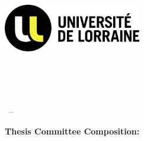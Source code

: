 \begin{titlepage}
    \begin{addmargin}[-1cm]{-3cm}
    \begin{center}
        \large  

        \hfill

        \vfill

        \begingroup
            \color{mypurple}\spacedallcaps{\myTitle} \\ \bigskip
        \endgroup

        \spacedlowsmallcaps{\myName}

        \vfill

        \includegraphics[width=6cm]{Assets/logo-ul.png} \\ \medskip

        \mySubtitle \\ \medskip   
        \myFaculty \\
        \myUni \\ \bigskip

        \myTime\ -- \myVersion

        \vfill
        
        \end{center}


        \vspace{1em}
        {\noindent\large\textbf{Thesis Committee Composition:}}


\end{addmargin}
\end{titlepage}
